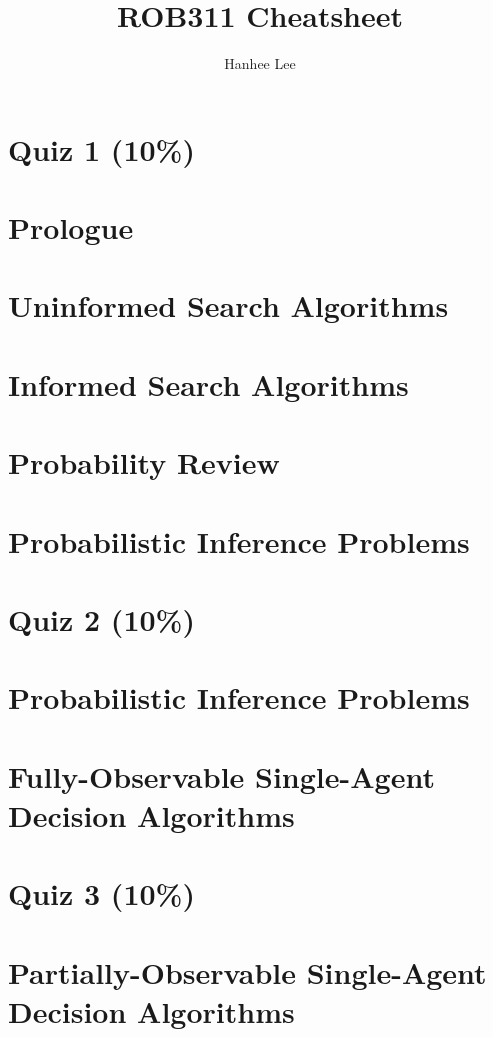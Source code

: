 \documentclass[twoside]{article}
\title{ROB311 Cheatsheet}
\author{Hanhee Lee}
\begin{document}
\section*{Quiz 1 (10\%)}

\section{Prologue}

\section{Uninformed Search Algorithms}

\section{Informed Search Algorithms}

\section{Probability Review}

\section{Probabilistic Inference Problems}

\section*{Quiz 2 (10\%)}

\section{Probabilistic Inference Problems}

\section{Fully-Observable Single-Agent Decision Algorithms}

\section*{Quiz 3 (10\%)}

\section{Partially-Observable Single-Agent Decision Algorithms}
\end{document}
